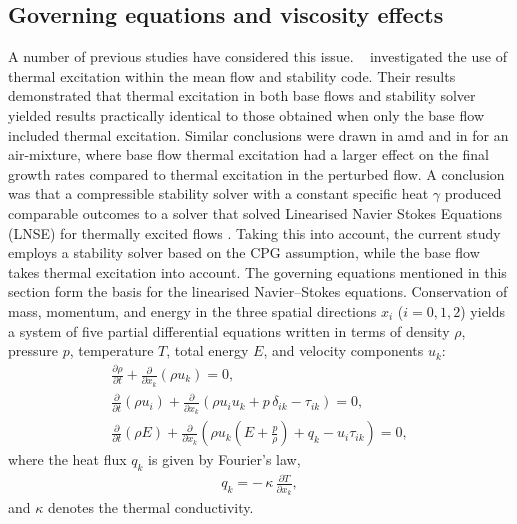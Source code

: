 \subsection{Governing equations and viscosity effects}
A number of previous studies have considered this issue. ~\cite{Wartemann2019} investigated the use of thermal excitation within the mean flow and stability code. Their results demonstrated that thermal excitation in both base flows and stability solver yielded results practically identical to those obtained when only the base flow included thermal excitation. Similar conclusions were drawn in \cite{MortensenZhong2013} amd \cite{miromiroThesis} and in 
\citep{BitterShepherd2015} for an air-mixture, where base flow thermal excitation had a larger effect on the final growth rates compared to thermal excitation in the perturbed flow. A conclusion was that a compressible stability solver with a constant specific heat $\gamma$ produced comparable outcomes to a solver that solved Linearised Navier Stokes Equations (LNSE) for thermally excited flows \cite{Wartemann2019}. Taking this into account, the current study employs a stability solver based on the \gls{CPG} assumption, while the base flow takes thermal excitation into account. The governing equations mentioned in this section form the basis for the linearised Navier--Stokes equations. Conservation of mass, momentum, and energy in the three spatial directions \(x_i\) (\(i = 0, 1, 2\)) yields a system of five partial differential equations written in terms of density \(\rho\), pressure \(p\), temperature \(T\), total energy \(E\), and velocity components \(u_k\):
\begin{align}
\frac{\partial \rho}{\partial t}
+ \frac{\partial}{\partial x_k}\!\left(\rho u_k\right) = 0, \\[0.5em]
\frac{\partial}{\partial t}\!\left(\rho u_i\right)
+ \frac{\partial}{\partial x_k}\!\left(\rho u_i u_k + p\,\delta_{ik} - \tau_{ik}\right) = 0, \\[0.5em]
\frac{\partial}{\partial t}\!\left(\rho E\right)
+ \frac{\partial}{\partial x_k}\!\left(
  \rho u_k\!\left(E + \frac{p}{\rho}\right) + q_k - u_i \tau_{ik}
\right) = 0,
\end{align}
where the heat flux \(q_k\) is given by Fourier’s law,
\begin{align}
q_k = -\,\kappa\,\frac{\partial T}{\partial x_k},
\end{align}
and \(\kappa\) denotes the thermal conductivity.


